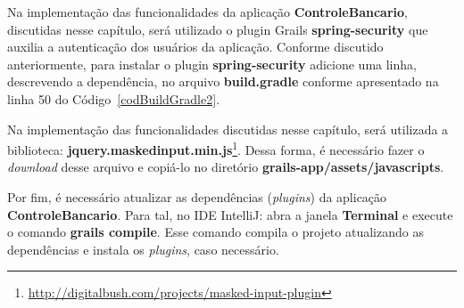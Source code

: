   Na implementação das funcionalidades
da aplicação {\bf ControleBancario}, discutidas nesse capítulo, será utilizado o
plugin Grails {\bf  spring-security} que auxilia a autenticação  dos usuários da
aplicação. Conforme discutido anteriormente, para
instalar  o  plugin {\bf  spring-security}  adicione  uma  linha, descrevendo  a
dependência, no arquivo  {\bf build.gradle} conforme apresentado na  linha 50 do
Código~\ref{codBuildGradle2}.  

\newpage

   Na implementação das
funcionalidades  discutidas nesse  capítulo, será  utilizada a  biblioteca: {\bf
  jquery.maskedinput.min.js}\footnote{\url{http://digitalbush.com/projects/masked-input-plugin}}. 
Dessa forma,  é necessário fazer  o {\it download}  desse arquivo e  copiá-lo no
diretório {\bf grails-app/assets/javascripts}.  

\vspace{0.5cm}

   Por  fim,  é  necessário
atualizar    as    dependências    ({\it    plugins})    da    aplicação    {\bf
  ControleBancario}. Para tal,  no IDE IntelliJ: abra a  janela {\bf Terminal} e
execute  o  comando  {\bf  grails  compile}.  Esse  comando  compila  o  projeto
atualizando as dependências e instala os {\it plugins}, caso necessário. 

